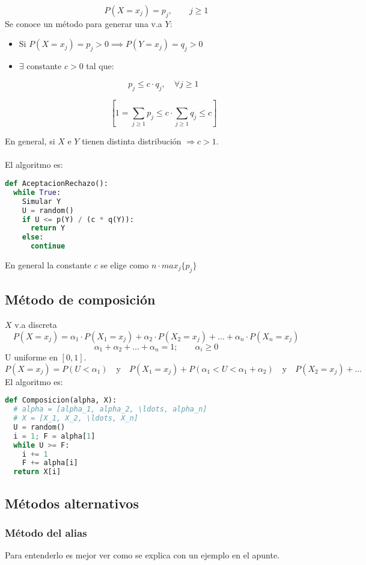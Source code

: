 \documentclass[11pt, a4paper]{article}
\theoremstyle{definition}
\begin{document}
\[
P(X = x_j) = p_j, \qquad j \geq 1
\]
Se conoce un método para generar una v.a $Y$:
\begin{itemize}
    \item  Si \(P(X = x_j) = p_j > 0 \implies P(Y = x_j) = q_j > 0 \)  
          
    \item $\exists$ constante \(c > 0\) tal que: 
    
          \[ p_j \leq c \cdot q_j, \quad \forall j \geq 1 \]
          
          \[ \left[ 1 = \sum_{j \geq 1} p_j \leq c \cdot \sum_{j \geq 1} q_j \leq c \right] \]
\end{itemize}

En general, si \( X \) e \( Y \) tienen distinta distribución \(\Rightarrow c > 1\).
\\ \\
El algoritmo es:
\begin{lstlisting}[language=Python]
def AceptacionRechazo():
  while True:
    Simular Y
    U = random()
    if U <= p(Y) / (c * q(Y)):
      return Y 
    else:
      continue 
\end{lstlisting}
En general la constante \( c \) se elige como $n \cdot max_j\{p_j\}$
\subsection{Método de composición}
$X$ v.a discreta
\[
P(X = x_j) = \alpha_1 \cdot P(X_1 = x_j) + \alpha_2 \cdot P(X_2 = x_j) + \ldots + \alpha_n \cdot P(X_n = x_j)
\]
\[
\alpha_1 + \alpha_2 + \ldots + \alpha_n = 1; \qquad \alpha_i \geq 0
\]
U uniforme en $[0, 1]$.
\[
P(X = x_j) = P( U < \alpha_1) \quad \text{y} \quad P(X_1 = x_j) + P( \alpha_1 < U < \alpha_1 + \alpha_2) \quad \text{y} \quad P(X_2 = x_j) + \ldots 
\]
El algoritmo es:
\begin{lstlisting}[language=Python]
def Composicion(alpha, X):
  # alpha = [alpha_1, alpha_2, \ldots, alpha_n]
  # X = [X_1, X_2, \ldots, X_n]
  U = random()
  i = 1; F = alpha[1]
  while U >= F:
    i += 1
    F += alpha[i]
  return X[i]
\end{lstlisting}

\subsection{Métodos alternativos}
\subsubsection{Método del alias}
Para entenderlo es mejor ver como se explica con un ejemplo en el apunte.
\end{document}
